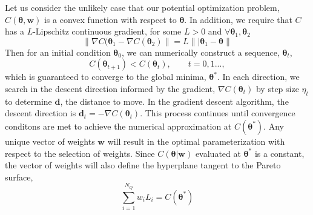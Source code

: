 
Let us consider the unlikely case that our potential optimization problem, $C(\bm{\theta},\bm{w})$ is a convex function with respect to $\bm{\theta}$.  In addition, we require that $C$ has a $L$-Lipschitz continuous gradient, for some $L > 0$ and $\forall \bm{\theta}_1, \bm{\theta}_2$
\begin{equation}
	\lVert \nabla C(\bm{\theta}_1 - \nabla C(\bm{\theta}_2) \rVert
	= L \lVert| \bm{\theta}_1 - \bm{\theta} \rVert
\end{equation}
Then for an initial condition $\bm{\theta}_0$, we can numerically construct a sequence, ${\bm{\theta}_t}$,
\begin{equation}
	C(\bm{\theta}_{t+1}) < C(\bm{\theta}_{t}), \qquad t = 0,1...,
\end{equation}
which is guaranteed to converge to the global minima, $\bm{\theta}^*$.
In each direction, we search in the descent direction informed by the gradient, $\nabla C(\bm{\theta}_t)$ by step size $\eta_t$ to determine $\bm{d}$, the distance to move.  In the gradient descent algorithm, the descent direction is $\bm{d}_t = - \nabla C(\bm{\theta}_t)$.  This process continues until convergence conditons are met to achieve the numerical approximation at $C(\bm{\theta}^*)$.  Any unique vector of weights $\bm{w}$ will result in the optimal parameterization with respect to the selection of weights.  Since $C(\bm{\theta}|\bm{w})$ evaluated at $\bm{\theta}^*$ is a constant, the vector of weights will also define the hyperplane tangent to the Pareto surface,
\begin{equation}
	\sum_{i=1}^{N_Q} w_i L_i = C(\bm{\theta}^*)
\end{equation}

